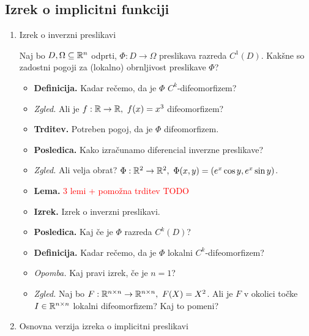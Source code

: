 \newpage
\subsection{Izrek o implicitni funkciji}
\begin{enumerate}
    \item Izrek o inverzni preslikavi
    
    Naj bo $D, \Omega \subseteq \mathbb{R}^n$ odprti, $\Phi: D \to \Omega$ preslikava razreda $C^1(D)$. Kakšne so zadostni pogoji za (lokalno) obrnljivost preslikave $\Phi$?
    
    \begin{itemize}
        \item \colorbox{purple!30}{\textbf{Definicija.}} Kadar rečemo, da je $\Phi$ $C^k$-difeomorfizem?
        \item \colorbox{yellow!30}{\emph{Zgled.}} Ali je $f: \mathbb{R} \to \mathbb{R}, \ f(x) = x^3$ difeomorfizem?        
        \item \colorbox{blue!30}{\textbf{Trditev.}} Potreben pogoj, da je $\Phi$ difeomorfizem.
        \item \colorbox{blue!30}{\textbf{Posledica.}} Kako izračunamo diferencial inverzne preslikave?

        \item \colorbox{yellow!30}{\emph{Zgled.}} Ali velja obrat? $\Phi: \R^2 \to \R^2, \ \Phi(x,y) = (e^x \cos y, e^x \sin y)$.
        \item \colorbox{blue!30}{\textbf{Lema.}} \textcolor{red}{3 lemi + pomožna trditev TODO}
        \item \colorbox{blue!30}{\textbf{Izrek.}} Izrek o inverzni preslikavi.
        \item \colorbox{orange!30}{\textbf{Posledica.}} Kaj če je $\Phi$ razreda $C^k(D)$?
        \item \colorbox{purple!30}{\textbf{Definicija.}} Kadar rečemo, da je $\Phi$ lokalni $C^k$-difeomorfizem?
        \item \colorbox{yellow!30}{\emph{Opomba.}} Kaj pravi izrek, če je $n = 1$?
        \item \colorbox{yellow!30}{\emph{Zgled.}}  Naj bo $F: \mathbb{R}^{n \times n} \to \mathbb{R}^{n \times n}, \ F(X) = X^2$. Ali je $F$ v okolici točke $I \in \mathbb{R}^{n \times n}$ lokalni difeomorfizem? Kaj to pomeni?
    \end{itemize}
    

    \item Osnovna verzija izreka o implicitni preslikavi
    

\end{enumerate}
